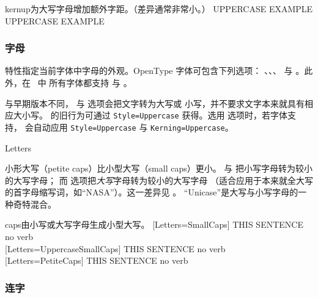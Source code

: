 \documentclass[a4paper]{l3doc}
\begin{document}
\begin{Xexample}[firstline=2]{kernup}{为大写字母增加额外字距。（差异通常非常小。）}
  \large
   UPPERCASE EXAMPLE \\
   UPPERCASE EXAMPLE
\end{Xexample}


\subsubsection{字母} \label{sec:letters}
 特性指定当前字体中字母的外观。OpenType 字体可包含下列选项：
、、、
 与 。此外，在 \LuaTeX\ 中
所有字体都支持  与 。

与早期版本不同， 与  选项会把文字转为大写或
小写，并不要求文字本来就具有相应大小写。 的旧行为可通过
\verb|Style=Uppercase| 获得。选用  选项时，若字体支持，
会自动应用 \verb|Style=Uppercase| 与 \verb|Kerning=Uppercase|。


\begin{features}{Letters}
\end{features}

小形大写（petite caps）比小型大写（small caps）更小。
 与  把小写字母转为较小的大写字母；
而  选项把\emph{大写}字母转为较小的大写字母
（适合应用于本来就全大写的首字母缩写词，如“NASA”）。这一差异见 。
“Unicase”是大写与小写字母的一种奇特混合。

\begin{Lexample}{caps}{由小写或大写字母生成小型大写。}
  [Letters=SmallCaps]
   THIS SENTENCE no verb                \\
  [Letters=UppercaseSmallCaps]
   THIS SENTENCE no verb                \\
  [Letters=PetiteCaps]
   THIS SENTENCE no verb
\end{Lexample}



\subsubsection{连字}
\label{sec:ot-feat-liga}
\end{document}
